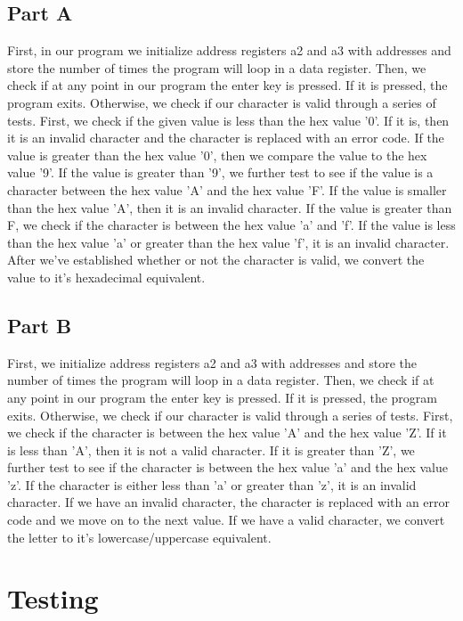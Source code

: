 \documentclass[10pt, letterpaper, titlepage]{article} %
\begin{document}
\begin{multicols*}{2}
\subsection{Part A}
First, in our program we initialize address registers a2 and a3 with addresses and store the number of times the program will loop in a data register. Then, we check if at any point in our program the enter key is pressed. If it is pressed, the program exits. Otherwise, we check if our character is valid through a series of tests. First, we check if the given value is less than the hex value '0'. If it is, then it is an invalid character and the character is replaced with an error code. If the value is greater than the hex value '0', then we compare the value to the hex value '9'. If the value is greater than '9', we further test to see if the value is a character between the hex value 'A' and the hex value 'F'. If the value is smaller than the hex value 'A', then it is an invalid character. If the value is greater than F, we check if the character is between the hex value 'a' and 'f'. If the value is less than the hex value 'a' or greater than the hex value 'f', it is an invalid character. After we've established whether or not the character is valid, we convert the value to it's hexadecimal equivalent.

\subsection{Part B}
First, we initialize address registers a2 and a3 with addresses and store the number of times the program will loop in a data register. Then, we check if at any point in our program the enter key is pressed. If it is pressed, the program exits. Otherwise, we check if our character is valid through a series of tests. First, we check if the character is between the hex value 'A' and the hex value 'Z'. If it is less than 'A', then it is not a valid character. If it is greater than 'Z', we further test to see if the character is between the hex value 'a' and the hex value 'z'. If the character is either less than 'a' or greater than 'z', it is an invalid character. If we have an invalid character, the character is replaced with an error code and we move on to the next value. If we have a valid character, we convert the letter to it's lowercase/uppercase equivalent.


\section{Testing}

\end{multicols*}
\end{document}

